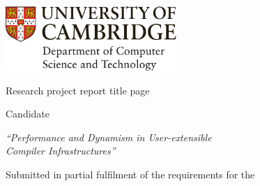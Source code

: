 \ifsubmission

\begin{defaultsffamily}
\begin{titlepage}
\makeatletter

\hspace*{-14mm}\includegraphics[width=65mm]{images/logo-dcst-colour}

\begin{Large}
\vspace{20mm}
Research project report title page

\vspace{35mm}
Candidate \candidatenumber

\vspace{42mm}
\textsl{``Performance and Dynamism in User-extensible \\
Compiler Infrastructures''}

\end{Large}

\vspace{\fill}
\begin{center}
Submitted in partial fulfilment of the requirements for the\\
\course
\end{center}

\makeatother
\end{titlepage}
\end{defaultsffamily}
\newpage

\else

